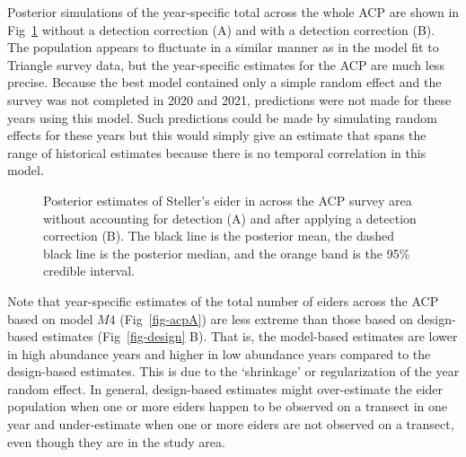 \documentclass[
  10pt,
  letterpaper,
]{article}
\begin{document}
Posterior simulations of the year-specific total across the whole ACP
are shown in Fig~\ref{fig-yearACP} without a detection correction (A)
and with a detection correction (B). The population appears to fluctuate
in a similar manner as in the model fit to Triangle survey data, but the
year-specific estimates for the ACP are much less precise. Because the
best model contained only a simple random effect and the survey was not
completed in 2020 and 2021, predictions were not made for these years
using this model. Such predictions could be made by simulating random
effects for these years but this would simply give an estimate that
spans the range of historical estimates because there is no temporal
correlation in this model.

\begin{figure}

\begin{minipage}{\linewidth}

\subcaption{\label{fig-acpA}}

\end{minipage}%
\newline
\begin{minipage}{\linewidth}

\subcaption{\label{fig-acpB}}

\end{minipage}%

\caption{\label{fig-yearACP}Posterior estimates of Steller's eider in
across the ACP survey area without accounting for detection (A) and
after applying a detection correction (B). The black line is the
posterior mean, the dashed black line is the posterior median, and the
orange band is the 95\% credible interval.}

\end{figure}%

Note that year-specific estimates of the total number of eiders across
the ACP based on model \(M4\) (Fig~\ref{fig-acpA}) are less extreme than
those based on design-based estimates (Fig~\ref{fig-design} B). That is,
the model-based estimates are lower in high abundance years and higher
in low abundance years compared to the design-based estimates. This is
due to the `shrinkage' or regularization of the year random effect. In
general, design-based estimates might over-estimate the eider population
when one or more eiders happen to be observed on a transect in one year
and under-estimate when one or more eiders are not observed on a
transect, even though they are in the study area.
\end{document}
